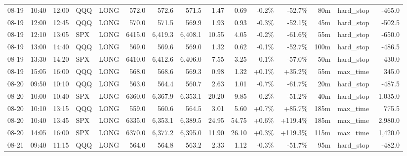\documentclass[11pt,a4paper,twoside]{article}
\begin{document}
\begin{landscape}
\begin{center}
\begin{longtable}{>{\color{txtmain}}l l l l l r r r r r r r r >{\color{txtmain}}l r}
08-19 & 10:40 & 12:00 & QQQ & LONG & 572.0 & 572.6 & 571.5 & 1.47 & 0.69 & \textcolor{lossred}{-0.2\%} & \textcolor{lossred}{-52.7\%} & 80m & hard\_stop & \textcolor{lossred}{-465.0} \\
08-19 & 12:00 & 12:45 & QQQ & LONG & 570.0 & 571.5 & 569.9 & 1.93 & 0.93 & \textcolor{lossred}{-0.3\%} & \textcolor{lossred}{-52.1\%} & 45m & hard\_stop & \textcolor{lossred}{-502.5} \\
08-19 & 12:10 & 13:05 & SPX & LONG & 6415.0 & 6,419.3 & 6,408.1 & 10.55 & 4.05 & \textcolor{lossred}{-0.2\%} & \textcolor{lossred}{-61.6\%} & 55m & hard\_stop & \textcolor{lossred}{-650.0} \\
08-19 & 13:00 & 14:40 & QQQ & LONG & 569.0 & 569.6 & 569.0 & 1.32 & 0.62 & \textcolor{lossred}{-0.1\%} & \textcolor{lossred}{-52.7\%} & 100m & hard\_stop & \textcolor{lossred}{-486.5} \\
08-19 & 13:30 & 14:20 & SPX & LONG & 6410.0 & 6,412.6 & 6,406.0 & 7.55 & 3.25 & \textcolor{lossred}{-0.1\%} & \textcolor{lossred}{-57.0\%} & 50m & hard\_stop & \textcolor{lossred}{-430.0} \\
08-19 & 15:05 & 16:00 & QQQ & LONG & 568.0 & 568.6 & 569.3 & 0.98 & 1.32 & \textcolor{wingreen}{+0.1\%} & \textcolor{wingreen}{+35.2\%} & 55m & max\_time & \textcolor{wingreen}{345.0} \\
08-20 & 09:50 & 10:10 & QQQ & LONG & 563.0 & 564.4 & 560.7 & 2.63 & 1.01 & \textcolor{lossred}{-0.7\%} & \textcolor{lossred}{-61.7\%} & 20m & hard\_stop & \textcolor{lossred}{-487.5} \\
08-20 & 10:00 & 10:40 & SPX & LONG & 6360.0 & 6,367.9 & 6,353.1 & 20.20 & 9.85 & \textcolor{lossred}{-0.2\%} & \textcolor{lossred}{-51.2\%} & 40m & hard\_stop & \textcolor{lossred}{-1,035.0} \\
08-20 & 10:10 & 13:15 & QQQ & LONG & 559.0 & 560.6 & 564.5 & 3.01 & 5.60 & \textcolor{wingreen}{+0.7\%} & \textcolor{wingreen}{+85.7\%} & 185m & max\_time & \textcolor{wingreen}{775.5} \\
08-20 & 10:40 & 13:45 & SPX & LONG & 6335.0 & 6,353.1 & 6,389.5 & 24.95 & 54.75 & \textcolor{wingreen}{+0.6\%} & \textcolor{wingreen}{+119.4\%} & 185m & max\_time & \textcolor{wingreen}{2,980.0} \\
08-20 & 14:05 & 16:00 & SPX & LONG & 6370.0 & 6,377.2 & 6,395.0 & 11.90 & 26.10 & \textcolor{wingreen}{+0.3\%} & \textcolor{wingreen}{+119.3\%} & 115m & max\_time & \textcolor{wingreen}{1,420.0} \\
08-21 & 09:40 & 11:15 & QQQ & LONG & 564.0 & 564.8 & 563.2 & 2.33 & 1.12 & \textcolor{lossred}{-0.3\%} & \textcolor{lossred}{-51.7\%} & 95m & hard\_stop & \textcolor{lossred}{-482.0} \\

\end{longtable}
\end{center}
\end{landscape}
\end{document}
